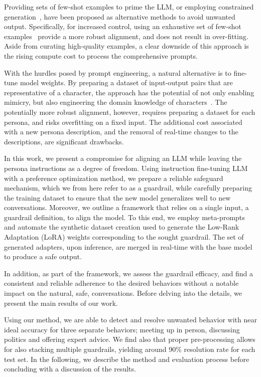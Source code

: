 \documentclass[letterpaper]{article}
\begin{document}
Providing sets of few-shot examples to prime the LLM, or employing constrained generation~\cite{loulasyntactic, zhao2024probabilistic, lew2023sequential}, have been proposed as alternative methods to avoid unwanted output. Specifically, for increased control, using an exhaustive set of few-shot examples~\cite{agarwal2024many} provide a more robust alignment, and does not result in over-fitting. 
Aside from curating high-quality examples, a clear downside of this approach is the rising compute cost to process the comprehensive prompts.

With the hurdles posed by prompt engineering, a natural alternative is to fine-tune model weights. By preparing a dataset of input-output pairs that are representative of a character, the approach has the potential of not only enabling mimicry, but also engineering the domain knowledge of characters~\cite{zhang2023instruction, shao2023character}.
The potentially more robust alignment, however, requires preparing a dataset for each persona, and risks overfitting on a fixed input. The additional cost associated with a new persona description, and the removal of real-time changes to the descriptions, are significant drawbacks.

In this work, we present a compromise for aligning an LLM while leaving the persona instructions as a degree of freedom. Using instruction fine-tuning LLM with a preference optimization method, we prepare a reliable safeguard mechanism, which we from here refer to as a guardrail, while carefully preparing the training dataset to ensure that the new model generalizes well to new conversations. Moreover, we outline a framework that relies on a single input, a guardrail definition, to align the model. 
To this end, we employ meta-prompts and automate the synthetic dataset creation used to generate the Low-Rank Adaptation (LoRA) weights corresponding to the sought guardrail. The set of generated adapters, upon inference, are merged in real-time with the base model to produce a safe output. 

In addition, as part of the framework, we assess the guardrail efficacy, and find a consistent and reliable adherence to the desired behaviors without a notable impact on the natural, safe, conversations.
Before delving into the details, we present the main results of our work. 

Using our method, we are able to detect and resolve unwanted behavior with near ideal accuracy for three separate behaviors; meeting up in person, discussing politics and offering expert advice. We find also that proper pre-processing allows for also stacking multiple guardrails, yielding around 90\% resolution rate for each test set. In the following, we describe the method and evaluation process before concluding with a discussion of the results.
\end{document}
